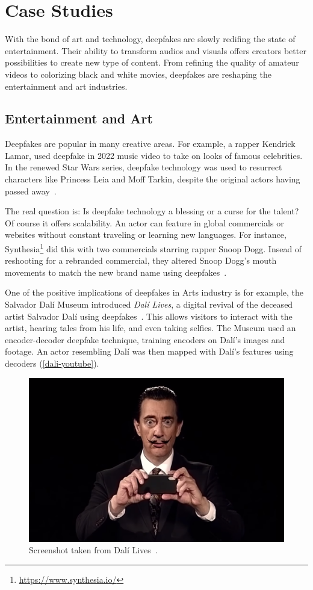 
\chapter{Case Studies}\label{chapter:applications}
With the bond of art and technology, deepfakes are slowly redifing the state of 
entertainment. Their ability to transform audios and visuals offers creators better
possibilities to create new type of content. From refining the quality of amateur
videos to colorizing black and white movies, deepfakes are reshaping the entertainment
and art industries. 


\section{Entertainment and Art}
Deepfakes are popular in many creative areas. For example, a rapper Kendrick Lamar,
used deepfake in 2022 music video to take on looks of famous celebrities. In the 
renewed Star Wars series, deepfake technology was used to resurrect characters like
Princess Leia and Moff Tarkin, despite the original actors having passed away~\cite{motion-analysis}. 

The real question is: Is deepfake technology a blessing or a curse for the talent?
Of course it offers scalability. An actor can feature in global commercials or websites
without constant traveling or learning new languages. For instance, Synthesia\footnote{\url{https://www.synthesia.io/}}
did this with two commercials starring rapper Snoop Dogg. Insead of reshooting for a
rebranded commercial, they altered Snoop Dogg's mouth movements to match the new brand 
name using deepfakes~\cite{wipo-magazine}.

One of the positive implications of deepfakes in Arts industry is for example, the Salvador
Dalí Museum introduced \textit{Dalí Lives}, a digital revival of the deceased artist 
Salvador Dalí using deepfakes~\cite{salvador-dali, salvador-dali2}. 
This allows visitors to interact with the artist, hearing tales from his life, and 
even taking selfies. The Museum used an encoder-decoder deepfake technique, training encoders on Dalí's 
images and footage. An actor resembling Dalí was then mapped with Dalí's features using
decoders (\autoref{dali-youtube}). 

\begin{figure}[ht]
	\centering
	\includegraphics[width=0.61\columnwidth]{figures/dali}
	\caption{Screenshot taken from Dalí Lives~\cite{salvador-dali-youtube}.}\label{dali-youtube}
\end{figure}

